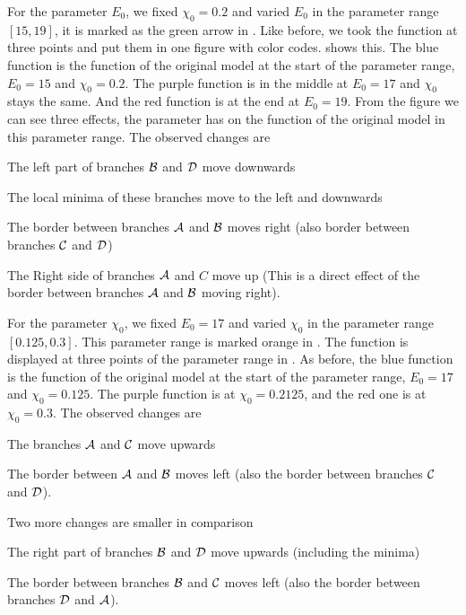 For the parameter $E_0$, we fixed $\chi_0 = 0.2$ and varied $E_0$ in the parameter range $[15, 19]$, it is marked as the green arrow in .
Like before, we took the function at three points and put them in one figure with color codes.
 shows this.
The blue function is the function of the original model at the start of the parameter range, $E_0 = 15$ and $\chi_0 = 0.2$.
The purple function is in the middle at $E_0 = 17$ and $\chi_0$ stays the same.
And the red function is at the end at $E_0 = 19$.
From the figure we can see three effects, the parameter has on the function of the original model in this parameter range.
The observed changes are
\begin{enumerate*}
	\item The left part of branches $\mathcal{B}$ and $\mathcal{D}$ move downwards
	\item The local minima of these branches move to the left and downwards
	\item The border between branches $\mathcal{A}$ and $\mathcal{B}$ moves right (also border between branches $\mathcal{C}$ and $\mathcal{D}$)
	\item The Right side of branches $\mathcal{A}$ and $C$ move up (This is a direct effect of the border between branches $\mathcal{A}$ and $\mathcal{B}$ moving right).
\end{enumerate*}

For the parameter $\chi_0$, we fixed $E_0 = 17$ and varied $\chi_0$ in the parameter range $[0.125, 0.3]$.
This parameter range is marked orange in .
The function is displayed at three points of the parameter range in .
As before, the blue function is the function of the original model at the start of the parameter range, $E_0 = 17$ and $\chi_0 = 0.125$.
The purple function is at $\chi_0 = 0.2125$, and the red one is at $\chi_0 = 0.3$.
The observed changes are
\begin{enumerate*}
	\item The branches $\mathcal{A}$ and $\mathcal{C}$ move upwards
	\item The border between $\mathcal{A}$ and $\mathcal{B}$ moves left (also the border between branches $\mathcal{C}$ and $\mathcal{D}$).
\end{enumerate*}
Two more changes are smaller in comparison
\begin{enumerate*}
	\item The right part of branches $\mathcal{B}$ and $\mathcal{D}$ move upwards (including the minima)
	\item The border between branches $\mathcal{B}$ and $\mathcal{C}$ moves left (also the border between branches $\mathcal{D}$ and $\mathcal{A}$).
\end{enumerate*}

